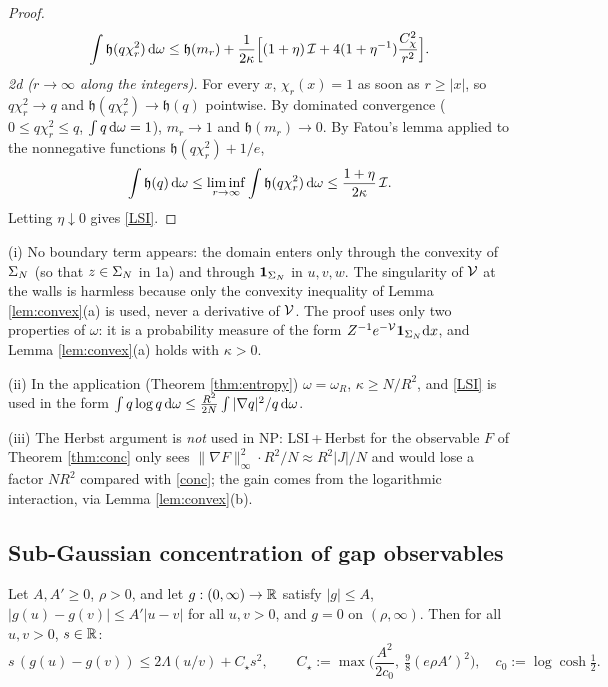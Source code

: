 \begin{proof}
\begin{equation}\label{c6:LSIr}
\int\mathfrak h(q\chi_r^2)\,\mathrm{d}\omega\le\mathfrak h(m_r)+\frac1{2\kappa}\Big[(1+\eta)\,\mathcal I+4(1+\eta^{-1})\frac{C_\chi^2}{r^2}\Big].
\end{equation}
\emph{2d ($r\to\infty$ along the integers).} For every $x$, $\chi_r(x)=1$ as soon as $r\ge|x|$, so $q\chi_r^2\to q$ and $\mathfrak h(q\chi_r^2)\to\mathfrak h(q)$ pointwise. By dominated convergence ($0\le q\chi_r^2\le q$, $\int q\,\mathrm{d}\omega=1$), $m_r\to1$ and $\mathfrak h(m_r)\to0$. By Fatou's lemma applied to the nonnegative functions $\mathfrak h(q\chi_r^2)+1/e$,
\[\int\mathfrak h(q)\,\mathrm{d}\omega\le\liminf_{r\to\infty}\int\mathfrak h(q\chi_r^2)\,\mathrm{d}\omega\le\frac{1+\eta}{2\kappa}\,\mathcal I .\]
Letting $\eta\downarrow0$ gives \eqref{LSI}.
\end{proof}

\begin{remark}\label{rem:LSI}
(i) No boundary term appears: the domain enters only through the convexity of $\Sigma_N$ (so that $z\in\Sigma_N$ in 1a) and through $\mathbf 1_{\Sigma_N}$ in $u,v,w$. The singularity of $\mathcal{V}$ at the walls is harmless because only the convexity inequality of Lemma \ref{lem:convex}(a) is used, never a derivative of $\mathcal{V}$.
The proof uses only two properties of $\omega$: it is a probability measure of the form $Z^{-1}e^{-\mathcal{V}}\mathbf 1_{\Sigma_N}\mathrm{d} x$, and Lemma \ref{lem:convex}(a) holds with $\kappa>0$.

(ii) In the application (Theorem \ref{thm:entropy}) $\omega=\omega_R$, $\kappa\ge N/R^2$, and \eqref{LSI} is used in the form $\int q\log q\,\mathrm{d}\omega\le\frac{R^2}{2N}\int|\nabla q|^2/q\,\mathrm{d}\omega$.

(iii) The Herbst argument is \emph{not} used in NP: LSI\,+\,Herbst for the observable $F$ of Theorem \ref{thm:conc} only sees $\|\nabla F\|_\infty^2\cdot R^2/N\approx R^2|J|/N$ and would lose a factor $NR^2$ compared with \eqref{conc}; the gain comes from the logarithmic interaction, via Lemma \ref{lem:convex}(b).
\end{remark}

\subsection{Sub-Gaussian concentration of gap observables}

\begin{lemma}\label{lem:2pt}
Let $A,A'\ge0$, $\rho>0$, and let $g:(0,\infty)\to\mathbb{R}$ satisfy $|g|\le A$, $|g(u)-g(v)|\le A'|u-v|$ for all $u,v>0$, and $g=0$ on $(\rho,\infty)$. Then for all $u,v>0$, $s\in\mathbb{R}$:
\[s\,(g(u)-g(v))\le2\Lambda(u/v)+C_\star s^2,\qquad C_\star:=\max\Big(\frac{A^2}{2c_0},\ \tfrac98(e\rho A')^2\Big),\quad c_0:=\log\cosh\tfrac12 .\]
\end{lemma}

